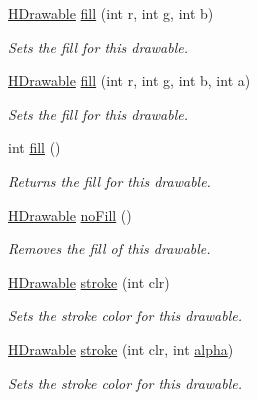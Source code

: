 \begin{DoxyCompactItemize}
\hyperlink{classhype_1_1drawable_1_1_h_drawable}{H\-Drawable} \hyperlink{classhype_1_1drawable_1_1_h_drawable_a675e37a29753adbabf891e7f51ea5508}{fill} (int r, int g, int b)
\begin{DoxyCompactList}\small\item\em Sets the fill for this drawable. \end{DoxyCompactList}\item 
\hyperlink{classhype_1_1drawable_1_1_h_drawable}{H\-Drawable} \hyperlink{classhype_1_1drawable_1_1_h_drawable_a27c54bd6420e20dc3966f407277986b4}{fill} (int r, int g, int b, int a)
\begin{DoxyCompactList}\small\item\em Sets the fill for this drawable. \end{DoxyCompactList}\item 
int \hyperlink{classhype_1_1drawable_1_1_h_drawable_a062e20742be8718d6069e7b50b1ebf36}{fill} ()
\begin{DoxyCompactList}\small\item\em Returns the fill for this drawable. \end{DoxyCompactList}\item 
\hyperlink{classhype_1_1drawable_1_1_h_drawable}{H\-Drawable} \hyperlink{classhype_1_1drawable_1_1_h_drawable_a079450cb1cd0463829ab1c8cb265c762}{no\-Fill} ()
\begin{DoxyCompactList}\small\item\em Removes the fill of this drawable. \end{DoxyCompactList}\item 
\hyperlink{classhype_1_1drawable_1_1_h_drawable}{H\-Drawable} \hyperlink{classhype_1_1drawable_1_1_h_drawable_a6c41a5164d1adab0d4592e88eaf27059}{stroke} (int clr)
\begin{DoxyCompactList}\small\item\em Sets the stroke color for this drawable. \end{DoxyCompactList}\item 
\hyperlink{classhype_1_1drawable_1_1_h_drawable}{H\-Drawable} \hyperlink{classhype_1_1drawable_1_1_h_drawable_a8b04db96fa8ce2c2d2298379c33022fe}{stroke} (int clr, int \hyperlink{classhype_1_1drawable_1_1_h_drawable_a03c7275f5caab5cc9034b18d4c2f1305}{alpha})
\begin{DoxyCompactList}\small\item\em Sets the stroke color for this drawable. \end{DoxyCompactList}\item 

\end{DoxyCompactItemize}
